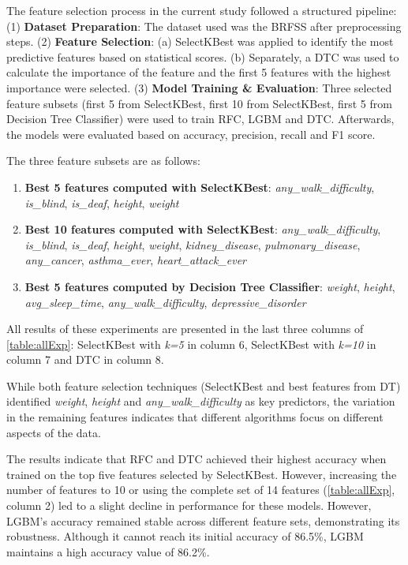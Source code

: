 \documentclass[runningheads]{llncs}
\begin{document}
The feature selection process in the current study followed a structured pipeline: 
(1) \textbf{Dataset Preparation}: The dataset used was the BRFSS after preprocessing steps. 
(2) \textbf{Feature Selection}: 
(a) SelectKBest was applied to identify the most predictive features based on statistical scores. 
(b) Separately, a DTC was used to calculate the importance of the feature and the first 5 features with the highest importance were selected. 
(3) \textbf{Model Training \& Evaluation}: Three selected feature subsets (first 5 from SelectKBest, first 10 from SelectKBest, first 5 from Decision Tree Classifier) were used to train RFC, LGBM and DTC. Afterwards, the models were evaluated based on accuracy, precision, recall and F1 score. 

The three feature subsets are as follows:

\begin{enumerate}
   \item \textbf{Best 5 features computed with \textbf{SelectKBest}}: 
   \textit{any\_walk\_difficulty},   \textit{is\_blind},  \textit{is\_deaf},    \textit{height},    \textit{weight}
      
    \item \textbf{Best 10 features computed with \textbf{SelectKBest}}: 
   \textit{any\_walk\_difficulty},   \textit{is\_blind},   \textit{is\_deaf},    \textit{height},    \textit{weight},   \textit{kidney\_disease},     \textit{pulmonary\_disease}, 
    \textit{any\_cancer},     \textit{asthma\_ever},    \textit{heart\_attack\_ever}
    
     \item \textbf{Best 5 features computed by Decision Tree Classifier}:      \textit{weight},      \textit{height},      \textit{avg\_sleep\_time}, \textit{any\_walk\_difficulty}, \textit{depressive\_disorder}
\end{enumerate}

All results of these experiments are presented in the last three columns of \autoref{table:allExp}: SelectKBest with \textit{k=5} in column 6, SelectKBest with \textit{k=10} in column 7 and DTC in column 8. 

While both feature selection techniques (SelectKBest and best features from DT) identified \textit{weight}, \textit{height} and \textit{any\_walk\_difficulty} as key predictors, the variation in the remaining features indicates that different algorithms focus on different aspects of the data.


The results indicate that RFC and DTC achieved their highest accuracy when trained on the top five features selected by SelectKBest. However, increasing the number of features to 10 or using the complete set of 14 features (\autoref{table:allExp}, column 2) led to a slight decline in performance for these models. However, LGBM's accuracy remained stable across different feature sets, demonstrating its robustness. Although it cannot reach its initial accuracy of  86.5\%, LGBM maintains a high accuracy value of 86.2\%. 
\end{document}
